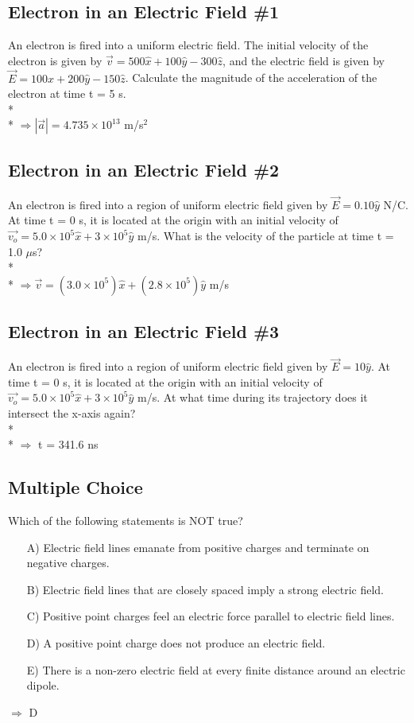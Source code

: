 \documentclass[11pt]{article}
\begin{document}
\subsection{Electron in an Electric Field \#1}
An electron is fired into a uniform electric field.  The initial velocity of the electron is given by $\vec{v} = 500 \hat{x} + 100 \hat{y} - 300 \hat{z}$, and the electric field is given by $\vec{E} = 100 \hat{x} + 200 \hat{y} - 150 \hat{z}$.  Calculate the magnitude of the acceleration of the electron at time t = 5 s. \\* \\*
$\Rightarrow |\vec{a}| = 4.735 \times 10^{13}$ m/s$^2$

\subsection{Electron in an Electric Field \#2}
An electron is fired into a region of uniform electric field given by $\vec{E} = 0.10\hat{y}$ N/C. At time t = 0 s, it is located at the origin with an initial velocity of $\vec{v_o} = 5.0 \times 10^5 \hat{x} + 3 \times 10^5 \hat{y}$  m/s.  What is the velocity of the particle at time t = 1.0 $\mu$s? \\* \\*
$\Rightarrow \vec{v} = (3.0\times10^5)\hat{x} + (2.8\times10^5)\hat{y}$ m/s

\subsection{Electron in an Electric Field \#3}
An electron is fired into a region of uniform electric field given by $\vec{E} = 10\hat{y}$. At time t = 0 s, it is located at the origin with an initial velocity of $\vec{v_o} = 5.0 \times 10^5 \hat{x} + 3 \times 10^5 \hat{y}$ m/s.  At what time during its trajectory does it intersect the x-axis again? \\* \\*
$\Rightarrow$ t = 341.6 ns

\subsection{Multiple Choice}
Which of the following statements is NOT true?

\begin{itemize}
	\item[A)] Electric field lines emanate from positive charges and terminate on negative charges.
	\item[B)] Electric field lines that are closely spaced imply a strong electric field.
	\item[C)] Positive point charges feel an electric force parallel to electric field lines.
	\item[D)] A positive point charge does not produce an electric field.
	\item[E)] There is a non-zero electric field at every finite distance around an electric dipole.
\end{itemize}
$\Rightarrow$ D
\end{document}
